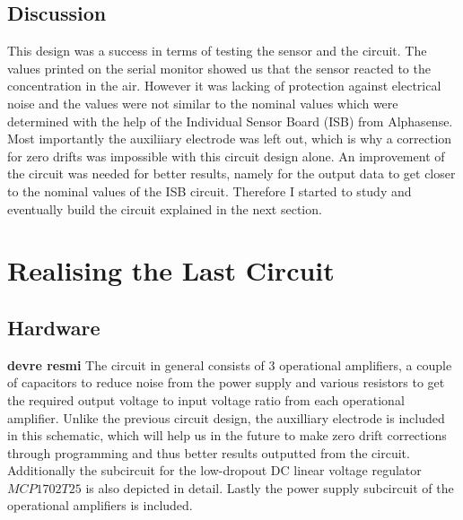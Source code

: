 \subsection{Discussion}
This design was a success in terms of testing the sensor and the circuit. The values printed on the serial monitor showed us that the sensor reacted to the  concentration in the air. However it was lacking of protection against electrical noise and the values were not similar to the nominal values which were determined with the help of the Individual Sensor Board (ISB) from Alphasense. Most importantly the auxiliiary electrode was left out, which is why a correction for zero drifts was impossible with this circuit design alone. An improvement of the circuit was needed for better results, namely for the output data to get closer to the nominal values of the ISB circuit. Therefore I started to study and eventually build the circuit explained in the next section.  


\section{Realising the Last Circuit}
\subsection{Hardware}
\textbf{devre resmi} The circuit in general consists of 3 operational amplifiers, a couple of capacitors to reduce noise from the power supply and various resistors to get the required output voltage to input voltage ratio from each operational amplifier. Unlike the previous circuit design, the auxilliary electrode is included in this schematic, which will help us in the future to make zero drift corrections through programming and thus better results outputted from the circuit. Additionally the subcircuit for the low-dropout DC linear voltage regulator $MCP1702T25$  is also depicted in detail. Lastly the power supply subcircuit of the operational amplifiers is included.

